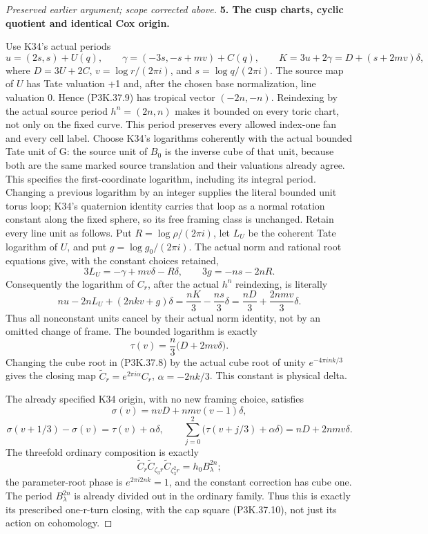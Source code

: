 \begin{proof}[Preserved earlier argument; scope corrected above]
\par\medskip\noindent\textbf{5. The cusp charts, cyclic quotient and identical Cox origin.}\enspace

Use K34's actual periods
\[
 u=(2s,s)+U(q),\qquad
 \gamma=(-3s,-s+mv)+C(q),\qquad
 K=3u+2\gamma=D+(s+2mv)\delta,
\]
where \(D=3U+2C\), \(v=\log r/(2\pi i)\), and
\(s=\log q/(2\pi i)\). The source map of \(U\) has Tate
valuation +1 and, after the chosen base normalization, line valuation 0.
Hence (P3K.37.9) has tropical vector \((-2n,-n)\). Reindexing by the
actual source period \(h^n=(2n,n)\) makes it bounded on every toric
chart, not only on the fixed curve. This period preserves every allowed
index-one fan and every cell label. Choose K34's logarithms coherently with
the actual bounded Tate unit of G: the source unit of \(B_0\) is the
inverse cube of that unit, because both are the same marked source translation
and their valuations already agree. This specifies the first-coordinate
logarithm, including its integral period. Changing a previous logarithm by an
integer supplies the literal bounded unit torus loop; K34's quaternion
identity carries that loop as a normal rotation constant along the fixed
sphere, so its free framing class is unchanged. Retain every line unit as
follows. Put \(R=\log\rho/(2\pi i)\), let \(L_U\) be the coherent
Tate logarithm of \(U\), and put \(g=\log g_0/(2\pi i)\). The
actual norm and rational root equations give, with the constant choices
retained,
\[
 3L_U=-\gamma+mv\delta-R\delta,\qquad
 3g=-ns-2nR.
\]
Consequently the logarithm of \(C_r\), after the actual \(h^n\)
reindexing, is literally
\[
 nu-2nL_U+(2nkv+g)\delta
   =\frac{nK}{3}-\frac{ns}{3}\delta
   =\frac{nD}{3}+\frac{2nmv}{3}\delta.
\]
Thus all nonconstant units cancel by their actual norm identity, not by an
omitted change of frame. The bounded logarithm is exactly
\[
 \tau(v)=\frac n3\bigl(D+2mv\delta\bigr).                      \tag{P3K.37.12}
\]
Changing the cube root in (P3K.37.8) by the actual cube root of unity
\(e^{-4\pi i nk/3}\) gives the closing map
\(\widetilde C_r=e^{2\pi i\alpha}C_r\),
\(\alpha=-2nk/3\). This constant is physical delta.

The already specified K34 origin, with no new framing choice, satisfies
\[
 \sigma(v)=nvD+nmv(v-1)\delta,
\]
\[
 \sigma(v+1/3)-\sigma(v)=\tau(v)+\alpha\delta,
\qquad
 \sum_{j=0}^{2}\bigl(\tau(v+j/3)+\alpha\delta\bigr)
       =nD+2nmv\delta.                                         \tag{P3K.37.13}
\]
The threefold ordinary composition is exactly
\[
 \widetilde C_r\widetilde C_{\zeta_3r}
       \widetilde C_{\zeta_3^2r}
     =h_0 B_\lambda^{2n};                                      \tag{P3K.37.14}
\]
the parameter-root phase is \(e^{2\pi i2nk}=1\), and the constant
correction has cube one. The period \(B_\lambda^{2n}\) is already
divided out in the ordinary family. Thus this is exactly its prescribed
one-r-turn closing, with the cap square (P3K.37.10), not just its action on
cohomology.


\end{proof}
